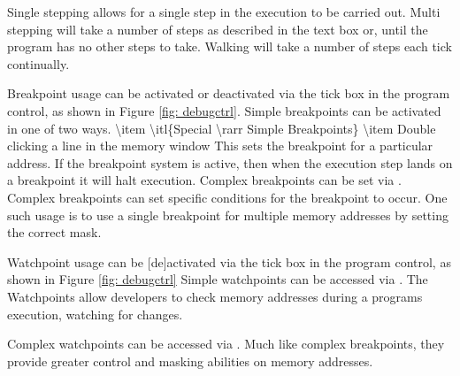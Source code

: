 \graphicspath{ {images/debug/} }
Single stepping allows for a single step in the execution to be carried out.
Multi stepping will take a number of steps as described in the text box or, until the program has no other steps to take.
Walking will take a number of steps each tick continually.

Breakpoint usage can be activated or deactivated via the tick box in the program control, as shown in Figure \ref{fig: debugctrl}.
Simple breakpoints can be activated in one of two ways.
\num{
  \item \itl{Special \rarr Simple Breakpoints}
  \item Double clicking a line in the memory window
}
This sets the breakpoint for a particular address. If the breakpoint system is active, then when the execution step lands on a breakpoint it will halt execution.
Complex breakpoints can be set via . Complex breakpoints can set specific conditions for the breakpoint to occur. One such usage is to use a single breakpoint for multiple memory addresses by setting the correct mask.

Watchpoint usage can be [de]activated via the tick box in the program control, as shown in Figure \ref{fig: debugctrl}
Simple watchpoints can be accessed via . The Watchpoints allow developers to check memory addresses during a programs execution, watching for changes.

Complex watchpoints can be accessed via . Much like complex breakpoints, they provide greater control and masking abilities on memory addresses.
